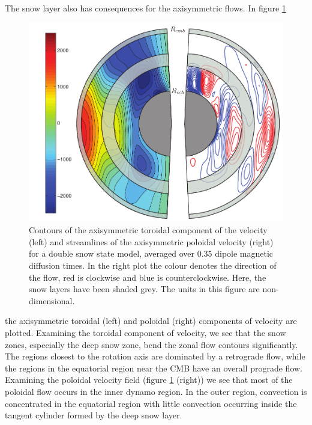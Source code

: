 The snow layer also has consequences for the axisymmetric flows. In figure \ref{fig:uax}
\begin{figure}
	\centering
	\noindent\includegraphics[width=.6\linewidth]{Chapter4/figures/uxtpavg19_043_2460-2530}
	\caption{Contours of the axisymmetric toroidal component of the velocity (left) and streamlines of the axisymmetric poloidal velocity (right) for a double snow state model, averaged over $0.35$ dipole magnetic diffusion times. In the right plot the colour denotes the direction of the flow, red is clockwise and blue is counterclockwise. Here, the snow layers have been shaded grey. The units in this figure are non-dimensional.}
	\label{fig:uax}
\end{figure}
 the axisymmetric toroidal (left) and poloidal (right) components of velocity are plotted. Examining the toroidal component of velocity, we see that the snow zones, especially the deep snow zone, bend the zonal flow contours significantly. The regions closest to the rotation axis are dominated by a retrograde flow, while the regions in the equatorial region near the CMB have an overall prograde flow. Examining the poloidal velocity field (figure \ref{fig:uax} (right)) we see that most of the poloidal flow occurs in the inner dynamo region. In the outer region, convection is concentrated in the equatorial region with little convection occurring inside the tangent cylinder formed by the deep snow layer. 


